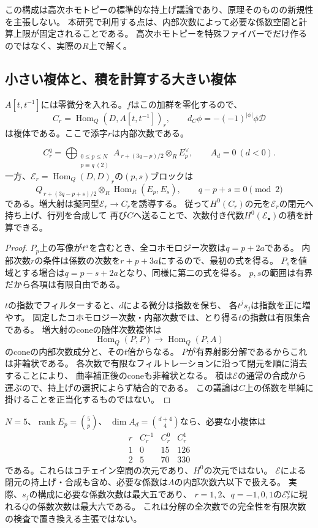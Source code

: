 この構成は高次ホモトピーの標準的な持上げ議論であり、原理そのものの新規性を主張しない。
本研究で利用する点は、内部次数によって必要な係数空間と計算上限が固定されることである。
高次ホモトピーを特殊ファイバーでだけ作るのではなく、実際の$R$上で解く。

\subsection{小さい複体と、積を計算する大きい複体}
$A[t,t^{-1}]$には零微分を入れる。$f$はこの加群を零化するので、
\[
 C_r=\operatorname{Hom}_Q(D,A[t,t^{-1}])_r,
 \qquad d_C\phi=-(-1)^{|\phi|}\phi\mathcal D
\]
は複体である。ここで添字$r$は内部次数である。
\begin{proposition}[各双次数の有限性]
\label{cd:prop:small-complex}
\[
 C_r^q=\bigoplus_{\substack{0\le p\le N\\p\equiv q\ (2)}}
 A_{\,r+(3q-p)/2}\otimes_R E_p^\vee,
 \qquad A_d=0\ (d<0).
\]
一方、$\mathcal E_r=\operatorname{Hom}_Q(D,D)_r$の$(p,s)$ブロックは
\[
 Q_{\,r+(3q-p+s)/2}\otimes_R
 \operatorname{Hom}_R(E_p,E_s),\qquad q-p+s\equiv0\pmod2
\]
である。増大射は擬同型$\mathcal E_r\to C_r$を誘導する。
従って$H^0(C_r)$の元を$\mathcal E_r$の閉元へ持ち上げ、行列を合成して
再び$C$へ送ることで、次数付き代数$H^0(\mathcal E_\bullet)$の積を計算できる。
\end{proposition}
\begin{proof}
$P_p$上の写像が$t^a$を含むとき、全コホモロジー次数は$q=p+2a$である。
内部次数$r$の条件は係数の次数を$r+p+3a$にするので、最初の式を得る。
$P_s$を値域とする場合は$q=p-s+2a$となり、同様に第二の式を得る。
$p,s$の範囲は有界だから各項は有限自由である。

$t$の指数でフィルターすると、$d$による微分は指数を保ち、
各$t^js_j$は指数を正に増やす。
固定したコホモロジー次数・内部次数では、とり得る$t$の指数は有限集合である。
増大射のconeの随伴次数複体は
\[
 \operatorname{Hom}_Q(P,P)\longrightarrow
 \operatorname{Hom}_Q(P,A)
\]
のconeの内部次数成分と、その$t$倍からなる。
$P$が有界射影分解であるからこれは非輪状である。
各次数で有限なフィルトレーションに沿って閉元を順に消去することにより、
曲率補正後のconeも非輪状となる。
積は$\mathcal E$の通常の合成から運ぶので、持上げの選択によらず結合的である。
この議論は$C$上の係数を単純に掛けることを正当化するものではない。
\end{proof}

$N=5$、$\operatorname{rank}E_p=\binom5p$、
$\dim A_d=\binom{d+4}{4}$なら、必要な小複体は
\[
\begin{array}{c|ccc}
 r& C_r^{-1}&C_r^0&C_r^1\\\hline
 1&0&15&126\\
 2&5&70&330
\end{array}
\]
である。これらはコチェイン空間の次元であり、$H^0$の次元ではない。
$\mathcal E$による閉元の持上げ・合成も含め、必要な係数は$A$の内部次数六以下で扱える。
実際、$s_j$の構成に必要な係数次数は最大五であり、
$r=1,2$、$q=-1,0,1$の$\mathcal E_r^q$に現れる$Q$の係数次数は最大六である。
これは分解の全次数での完全性を有限次数の検査で置き換える主張ではない。

